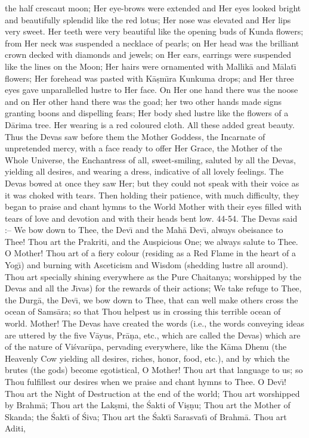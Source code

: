 the half crescaut moon; Her eye-brows were extended and Her eyes looked bright and beautifully splendid like the red lotus; Her nose was elevated and Her lips very sweet. Her teeth were very beautiful like the opening buds of Kunda flowers; from Her neck was suspended a necklace of pearls; on Her head was the brilliant crown decked with diamonds and jewels; on Her ears, earrings were suspended like the lines on the Moon; Her hairs were ornamented with Mallik\=a and M\=alat\={\i} flowers; Her forehead was pasted with K\=a\d{s}m\={\i}ra Kunkuma drops; and Her three eyes gave unparallelled lustre to Her face. On Her one hand there was the noose and on Her other hand there was the goad; her two other hands made signs granting boons and dispelling fears; Her body shed lustre like the flowers of a D\=arima tree. Her wearing is a red coloured cloth. All these added great beauty. Thus the Devas saw before them the Mother Goddess, the Incarnate of unpretended mercy, with a face ready to offer Her Grace, the Mother of the Whole Universe, the Enchantress of all, sweet-smiling, saluted by all the Devas, yielding all desires, and wearing a dress, indicative of all lovely feelings. The Devas bowed at once they saw Her; but they could not speak with their voice as it was choked with tears. Then holding their patience, with much difficulty, they began to praise and chant hymns to the World Mother with their eyes filled with tears of love and devotion and with their heads bent low.
44-54. The Devas said :-- We bow down to Thee, the Dev\={\i} and the Mah\=a Dev\={\i}, always obeisance to Thee! Thou art the Prakriti, and the Auspicious One; we always salute to Thee. O Mother! Thou art of a fiery colour (residing as a Red Flame in the heart of a Yog\={\i}) and burning with Asceticism and Wisdom (shedding lustre all around). Thou art specially shining everywhere as the Pure Chaitanya; worshipped by the Devas and all the J\={\i}vas) for the rewards of their actions; We take refuge to Thee, the Durg\=a, the Dev\={\i}, we bow down to Thee, that can well make others cross the ocean of Sams\=ara; so that Thou helpest us in crossing this terrible ocean of world. Mother! The Devas have created the words (i.e., the words conveying ideas are uttered by the five V\=ayus, Pr\=a\d{n}a, etc., which are called the Devas) which are of the nature of Vi\'svar\=upa, pervading everywhere, like the K\=ama Dhenu (the Heavenly Cow yielding all desires, riches, honor, food, etc.), and by which the brutes (the gods) become egotistical, O Mother! Thou art that language to us; so Thou fulfillest our desires when we praise and chant hymns to Thee. O Dev\={\i}! Thou art the Night of Destruction at the end of the world; Thou art worshipped by Brahm\=a; Thou art the Lak\d{s}mi, the \'Sakti of Vi\d{s}\d{n}u; Thou art the Mother of Skanda; the \'Sakt\={\i} of \'Siva; Thou art the \'Sakt\={\i} Sarasvat\={\i} of Brahm\=a. Thou art Aditi,

